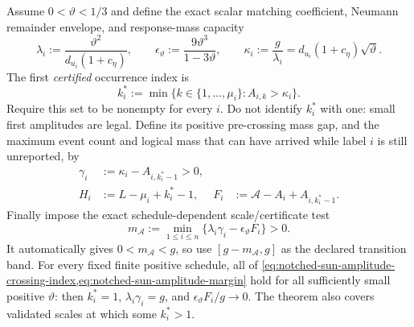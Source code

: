 \begin{theorem}
Assume $0<\vartheta<1/3$ and define the exact scalar matching coefficient,
Neumann remainder envelope, and response-mass capacity
\begin{equation}
 \lambda_i:=\frac{\vartheta^2}{d_{u_i}(1+c_\eta)},
 \qquad
 \epsilon_\vartheta:=\frac{9\vartheta^3}{1-3\vartheta},
 \qquad
 \kappa_i:=\frac{g}{\lambda_i}
 =d_{u_i}(1+c_\eta)\sqrt\vartheta.
 \label{eq:notched-sun-amplitude-capacity}
\end{equation}
The first \emph{certified} occurrence index is
\begin{equation}
 k_i^*:=\min\{k\in\{1,\ldots,\mu_i\}:A_{i,k}>\kappa_i\}.
 \label{eq:notched-sun-amplitude-crossing-index}
\end{equation}
Require this set to be nonempty for every $i$.  Do not identify $k_i^*$ with
one: small first amplitudes are legal.  Define its positive pre-crossing mass
gap, and the maximum event count and logical mass that can have arrived while
label $i$ is still unreported, by
\begin{align}
 \gamma_i
 &:=\kappa_i-A_{i,k_i^*-1}>0,
 \label{eq:notched-sun-amplitude-capacity-gap}\\
 H_i
 &:=L-\mu_i+k_i^*-1,
 &
 F_i
 &:=\mathcal A-A_i+A_{i,k_i^*-1}.
 \label{eq:notched-sun-amplitude-future-capacities}
\end{align}
Finally impose the exact schedule-dependent scale/certificate test
\begin{equation}
 m_{\mathcal A}
 :=\min_{1\leq i\leq n}
   \{\lambda_i\gamma_i-\epsilon_\vartheta F_i\}>0.
 \label{eq:notched-sun-amplitude-margin}
\end{equation}
It automatically gives $0<m_{\mathcal A}<g$, so use
$[g-m_{\mathcal A},g]$ as the declared transition band.  For every fixed
finite positive schedule, all of
\cref{eq:notched-sun-amplitude-crossing-index,eq:notched-sun-amplitude-margin}
hold for all sufficiently small positive $\vartheta$: then $k_i^*=1$,
$\lambda_i\gamma_i=g$, and
$\epsilon_\vartheta F_i/g\to0$.  The theorem also covers validated scales at
which some $k_i^*>1$.


\end{theorem}
